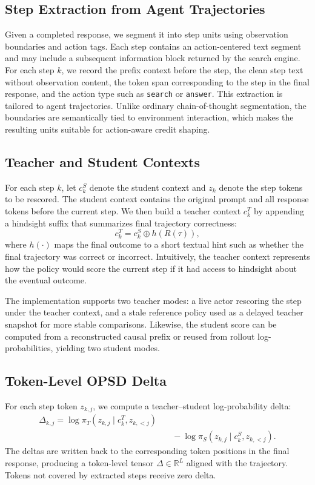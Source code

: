 \documentclass[11pt]{article}
\newcommand{\R}{\mathbb{R}}
\begin{document}
\subsection{Step Extraction from Agent Trajectories}
Given a completed response, we segment it into step units using observation boundaries and action tags. Each step contains an action-centered text segment and may include a subsequent information block returned by the search engine. For each step $k$, we record the prefix context before the step, the clean step text without observation content, the token span corresponding to the step in the final response, and the action type such as \texttt{search} or \texttt{answer}. This extraction is tailored to agent trajectories. Unlike ordinary chain-of-thought segmentation, the boundaries are semantically tied to environment interaction, which makes the resulting units suitable for action-aware credit shaping.

\subsection{Teacher and Student Contexts}
For each step $k$, let $c_k^S$ denote the student context and $z_k$ denote the step tokens to be rescored. The student context contains the original prompt and all response tokens before the current step. We then build a teacher context $c_k^T$ by appending a hindsight suffix that summarizes final trajectory correctness:
\begin{equation}
c_k^T = c_k^S \oplus h(R(\tau)),
\end{equation}
where $h(\cdot)$ maps the final outcome to a short textual hint such as whether the final trajectory was correct or incorrect. Intuitively, the teacher context represents how the policy would score the current step if it had access to hindsight about the eventual outcome.

The implementation supports two teacher modes: a live actor rescoring the step under the teacher context, and a stale reference policy used as a delayed teacher snapshot for more stable comparisons. Likewise, the student score can be computed from a reconstructed causal prefix or reused from rollout log-probabilities, yielding two student modes.

\subsection{Token-Level OPSD Delta}
For each step token $z_{k,j}$, we compute a teacher--student log-probability delta:
\begin{equation}
\begin{aligned}
\Delta_{k,j} =
\log \pi_T(z_{k,j} \mid c_k^T, z_{k,<j})
\\
&\quad - \log \pi_S(z_{k,j} \mid c_k^S, z_{k,<j}).
\end{aligned}
\end{equation}
The deltas are written back to the corresponding token positions in the final response, producing a token-level tensor $\Delta \in \R^L$ aligned with the trajectory. Tokens not covered by extracted steps receive zero delta.
\end{document}
